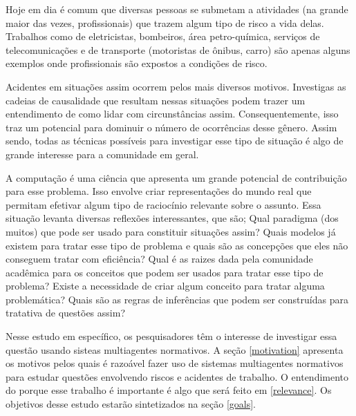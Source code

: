 Hoje em dia é comum que diversas pessoas se submetam a atividades (na grande maior das vezes, profissionais) que trazem algum tipo de risco a vida delas. Trabalhos como de eletricistas, bombeiros, área petro-química, serviços de telecomunicações e de transporte (motoristas de ônibus, carro) são apenas alguns exemplos onde profissionais são  expostos a condições de risco.

Acidentes em situações assim ocorrem pelos mais diversos motivos. Investigas as cadeias de causalidade que resultam nessas situações podem trazer um entendimento de como lidar com circunstâncias assim. Consequentemente, isso traz um potencial para dominuir o número de ocorrências desse gênero. Assim sendo, todas as técnicas possíveis para 
investigar esse tipo de situação é algo de grande interesse para a comunidade em geral. 

A computação é uma ciência que apresenta um grande potencial de contribuição para esse problema. Isso envolve criar representações do mundo real que permitam efetivar algum tipo de raciocínio relevante sobre o assunto. Essa situação levanta diversas reflexões interessantes, que são; Qual paradigma (dos muitos) que pode ser usado para constituir situações assim? Quais modelos já existem para tratar esse tipo de problema e quais são as concepções que eles não conseguem tratar com eficiência? Qual é as raizes dada pela comunidade acadêmica para os conceitos que podem ser usados para tratar esse tipo de problema? Existe a necessidade de criar algum conceito para tratar 
alguma problemática? Quais são as regras de inferências que podem ser construídas para tratativa de questões assim? 

Nesse estudo em específico, os pesquisadores têm o interesse de investigar essa questão usando sisteas multiagentes normativos. A seção \ref{motivation} apresenta os motivos pelos quais é razoável fazer uso de sistemas multiagentes normativos para estudar questões envolvendo riscos e acidentes de trabalho. O entendimento do porque 
esse trabalho é importante é algo que será feito em \ref{relevance}. Os objetivos desse estudo estarão sintetizados na seção \ref{goals}.
